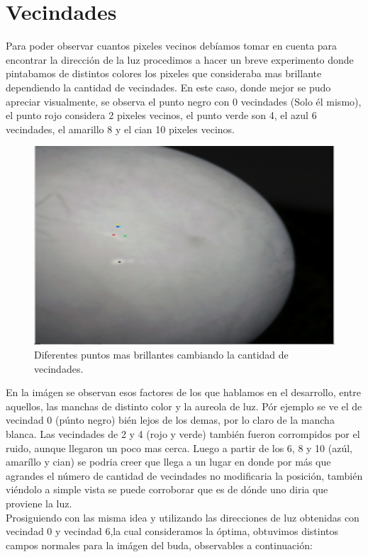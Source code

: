 

\section{Vecindades}

Para poder observar cuantos pixeles vecinos debíamos tomar en cuenta para encontrar la dirección de la luz procedimos a hacer un breve experimento donde pintabamos de distintos colores los pixeles que consideraba mas brillante dependiendo la cantidad de vecindades. En este caso, donde mejor se pudo apreciar visualmente, se observa el punto negro con 0 vecindades (Solo él mismo), el punto rojo considera 2 pixeles vecinos, el punto verde son 4, el azul 6 vecindades, el amarillo 8 y el cian 10 pixeles vecinos.

\begin{figure}[h]
   \includegraphics[scale=0.6]{ejemplo.png}
   \caption{Diferentes puntos mas brillantes cambiando la cantidad de vecindades.}
   \label{Fig. 1}
\end{figure}

\indent En la imágen se observan esos factores de los que hablamos en el desarrollo, entre aquellos, las manchas de distinto color y la aureola de luz. Pór ejemplo se ve el de vecindad 0 (púnto negro) bién lejos de los demas, por lo claro de la mancha blanca. Las vecindades de 2 y 4 (rojo y verde) también fueron corrompidos por el ruido, aunque llegaron un poco mas cerca. Luego a partir de los 6, 8 y 10 (azúl, amaríllo y cian) se podria creer que llega a un lugar en donde por más que agrandes el número de cantidad de vecindades no modificaria la posición, también viéndolo a simple vista se puede corroborar que es de dónde uno diria que proviene la luz.
\\
Prosiguiendo con las misma idea y utilizando las direcciones de luz obtenidas con vecindad 0 y vecindad 6,la cual consideramos la óptima, obtuvimos distintos campos normales para la imágen del buda, observables a continuación:


